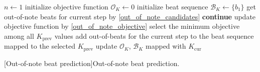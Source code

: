 \begin{algorithm}[ht!]
\begin{algorithmic}[1]
\State $n \gets 1$
    \State initialize objective function $\mathcal{O}_K\gets 0$
    \State initialize beat sequence $\mathcal{B}_K\gets \{b_1\}$
\EndFor
{}
        \State get out-of-note beats for current step by \eqref{out_of_note_candidates}
            \State \textbf{continue}
        \EndIf
            \State update objective function by \eqref{out_of_note_objective}
        \EndFor
        \State select the minimum objective among all $K_{\textrm{prev}}$ values
        \State add out-of-beats for the current step to the beat sequence mapped to the selected $K_{\textrm{prev}}$
    \EndFor
        \State update $\mathcal{O}_K$, $\mathcal{B}_K$ mapped with $K_{\textrm{cur}}$
    \EndFor
\EndFor
\State {}
\end{algorithmic}
[Out-of-note beat prediction]{Out-of-note beat prediction.}
\end{algorithm}